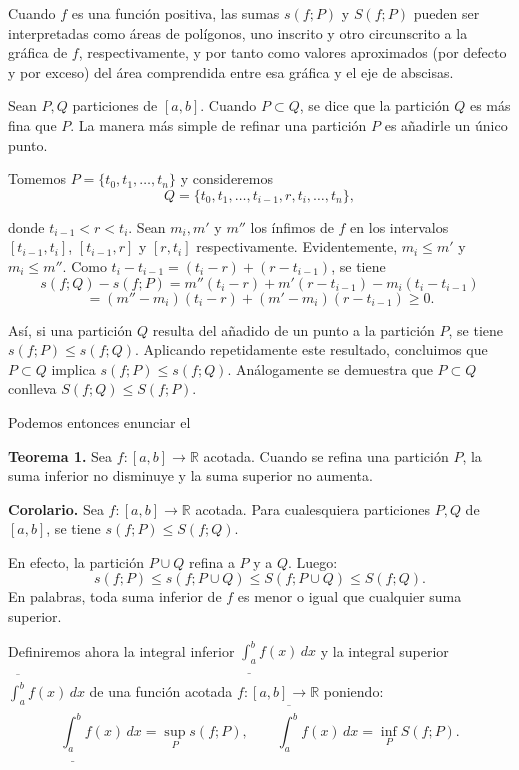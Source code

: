 \documentclass[12pt,oneside]{book}
\begin{document}
Cuando \(f\) es una función positiva, las sumas \(s(f; P)\) y \(S(f; P)\) pueden ser interpretadas como áreas de polígonos, uno inscrito y otro circunscrito a la gráfica de \(f\), respectivamente, y por tanto como valores aproximados (por defecto y por exceso) del área comprendida entre esa gráfica y el eje de abscisas.

Sean \(P, Q\) particiones de \([a, b]\). Cuando \(P \subset Q\), se dice que la partición \(Q\) es más fina que \(P\). La manera más simple de refinar una partición \(P\) es añadirle un único punto.

Tomemos \(P = \{t_0, t_1, \ldots, t_n\}\) y consideremos
\[Q = \{t_0, t_1, \ldots, t_{i-1}, r, t_i, \ldots, t_n\},\]

donde \(t_{i-1} < r < t_i\). Sean \(m_i, m'\) y \(m''\) los ínfimos de \(f\) en los intervalos \([t_{i-1}, t_i]\), \([t_{i-1}, r]\) y \([r, t_i]\) respectivamente. Evidentemente, \(m_i \leq m'\) y \(m_i \leq m''\). Como \(t_i - t_{i-1} = (t_i - r) + (r - t_{i-1})\), se tiene
\[s(f; Q) - s(f; P) = m''(t_i - r) + m'(r - t_{i-1}) - m_i(t_i - t_{i-1})\]\[= (m'' - m_i)(t_i - r) + (m' - m_i)(r - t_{i-1}) \geq 0.\]

Así, si una partición \(Q\) resulta del añadido de un punto a la partición \(P\), se tiene \(s(f; P) \leq s(f; Q)\). Aplicando repetidamente este resultado, concluimos que \(P \subset Q\) implica \(s(f; P) \leq s(f; Q)\). Análogamente se demuestra que \(P \subset Q\) conlleva \(S(f; Q) \leq S(f; P)\).

Podemos entonces enunciar el

\textbf{Teorema 1.} Sea \(f : [a, b] \to \mathbb{R}\) acotada. Cuando se refina una partición \(P\), la suma inferior no disminuye y la suma superior no aumenta.

\textbf{Corolario.} Sea \(f : [a, b] \to \mathbb{R}\) acotada. Para cualesquiera particiones \(P, Q\) de \([a, b]\), se tiene \(s(f; P) \leq S(f; Q)\).

En efecto, la partición \(P \cup Q\) refina a \(P\) y a \(Q\). Luego:
\[
s(f; P) \leq s(f; P \cup Q) \leq S(f; P \cup Q) \leq S(f; Q).
\]
En palabras, toda suma inferior de \(f\) es menor o igual que cualquier suma superior.

Definiremos ahora la integral inferior \(\underline{\int_a^b} f(x)\,dx\) y la integral superior \(\overline{\int_a^b} f(x)\,dx\) de una función acotada \(f : [a, b] \to \mathbb{R}\) poniendo:
\[
\underline{\int_a^b} f(x)\,dx = \sup_P s(f; P), \qquad \overline{\int_a^b} f(x)\,dx = \inf_P S(f; P).
\]
\end{document}

